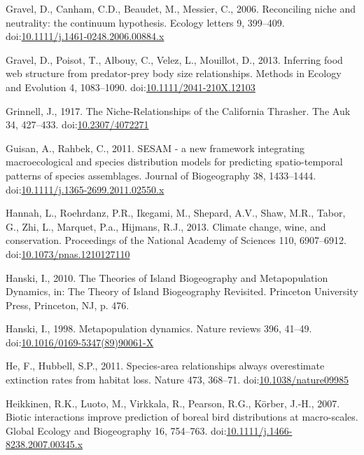 \hypertarget{ref-Gravel2006a}{}
Gravel, D., Canham, C.D., Beaudet, M., Messier, C., 2006. Reconciling
niche and neutrality: the continuum hypothesis. Ecology letters 9,
399--409.
doi:\href{https://doi.org/10.1111/j.1461-0248.2006.00884.x}{10.1111/j.1461-0248.2006.00884.x}

\hypertarget{ref-Gravel2013a}{}
Gravel, D., Poisot, T., Albouy, C., Velez, L., Mouillot, D., 2013.
Inferring food web structure from predator-prey body size relationships.
Methods in Ecology and Evolution 4, 1083--1090.
doi:\href{https://doi.org/10.1111/2041-210X.12103}{10.1111/2041-210X.12103}

\hypertarget{ref-Grinnell1917a}{}
Grinnell, J., 1917. The Niche-Relationships of the California Thrasher.
The Auk 34, 427--433.
doi:\href{https://doi.org/10.2307/4072271}{10.2307/4072271}

\hypertarget{ref-Guisan2011}{}
Guisan, A., Rahbek, C., 2011. SESAM - a new framework integrating
macroecological and species distribution models for predicting
spatio-temporal patterns of species assemblages. Journal of Biogeography
38, 1433--1444.
doi:\href{https://doi.org/10.1111/j.1365-2699.2011.02550.x}{10.1111/j.1365-2699.2011.02550.x}

\hypertarget{ref-Hannah2013}{}
Hannah, L., Roehrdanz, P.R., Ikegami, M., Shepard, A.V., Shaw, M.R.,
Tabor, G., Zhi, L., Marquet, P.a., Hijmans, R.J., 2013. Climate change,
wine, and conservation. Proceedings of the National Academy of Sciences
110, 6907--6912.
doi:\href{https://doi.org/10.1073/pnas.1210127110}{10.1073/pnas.1210127110}

\hypertarget{ref-Hanski2010}{}
Hanski, I., 2010. The Theories of Island Biogeography and Metapopulation
Dynamics, in: The Theory of Island Biogeography Revisited. Princeton
University Press, Princeton, NJ, p. 476.

\hypertarget{ref-Hanski1998}{}
Hanski, I., 1998. Metapopulation dynamics. Nature reviews 396, 41--49.
doi:\href{https://doi.org/10.1016/0169-5347(89)90061-X}{10.1016/0169-5347(89)90061-X}

\hypertarget{ref-He2011}{}
He, F., Hubbell, S.P., 2011. Species-area relationships always
overestimate extinction rates from habitat loss. Nature 473, 368--71.
doi:\href{https://doi.org/10.1038/nature09985}{10.1038/nature09985}

\hypertarget{ref-Heikkinen2007}{}
Heikkinen, R.K., Luoto, M., Virkkala, R., Pearson, R.G., Körber, J.-H.,
2007. Biotic interactions improve prediction of boreal bird
distributions at macro-scales. Global Ecology and Biogeography 16,
754--763.
doi:\href{https://doi.org/10.1111/j.1466-8238.2007.00345.x}{10.1111/j.1466-8238.2007.00345.x}

